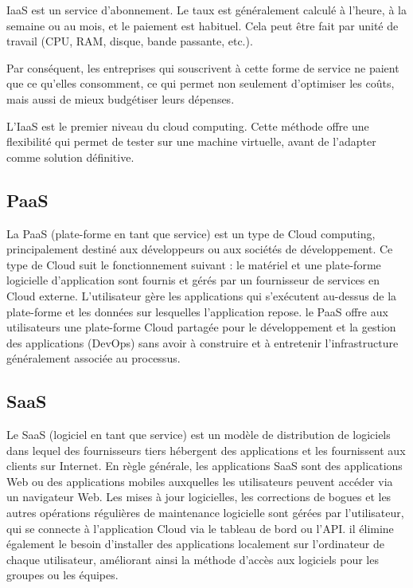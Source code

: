 \documentclass[pfe]{tnreport} %
\begin{document}
IaaS est un service d'abonnement. Le taux est généralement calculé à l'heure, à la semaine ou au mois, et le paiement est habituel. Cela peut être fait par unité de travail (CPU, RAM, disque, bande passante, etc.).

Par conséquent, les entreprises qui souscrivent à cette forme de service ne paient que ce qu'elles consomment, ce qui permet non seulement d'optimiser les coûts, mais aussi de mieux budgétiser leurs dépenses.

L'IaaS est le premier niveau du cloud computing. Cette méthode offre une flexibilité qui permet de tester sur une machine virtuelle, avant de l'adapter comme solution définitive.

\subsection{PaaS}

La PaaS (plate-forme en tant que service) est un type de Cloud computing, principalement destiné aux développeurs ou aux sociétés de développement.
Ce type de Cloud suit le fonctionnement suivant : le matériel et une plate-forme logicielle d'application sont fournis et gérés par un fournisseur de services en Cloud externe.
L'utilisateur gère les applications qui s'exécutent au-dessus de la plate-forme et les données sur lesquelles l'application repose. 
le PaaS offre aux utilisateurs une plate-forme Cloud partagée pour le développement et la gestion des applications (DevOps) sans avoir à construire et à entretenir l'infrastructure généralement associée au processus.


\subsection{SaaS}

Le SaaS (logiciel en tant que service) est un modèle de distribution de logiciels dans lequel des fournisseurs tiers hébergent des applications et les fournissent aux clients sur Internet.
En règle générale, les applications SaaS sont des applications Web ou des applications mobiles auxquelles les utilisateurs peuvent accéder via un navigateur Web. Les mises à jour logicielles, les corrections de bogues et les autres opérations régulières de maintenance logicielle sont gérées par l'utilisateur, qui se connecte à l'application Cloud via le tableau de bord ou l'API. il élimine également le besoin d'installer des applications localement sur l'ordinateur de chaque utilisateur, améliorant ainsi la méthode d'accès aux logiciels pour les groupes ou les équipes. \newline
\end{document}
